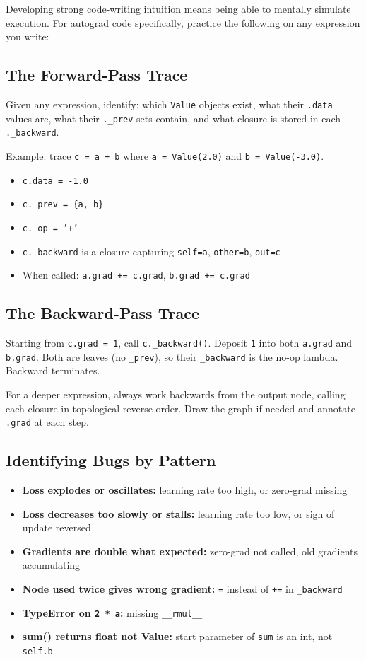\documentclass[12pt,a4paper]{article}
\newcommand{\code}[1]{\texttt{\small\color{deepblue}#1}}
\begin{document}
Developing strong code-writing intuition means being able to mentally simulate execution. For autograd code specifically, practice the following on any expression you write:

\subsection{The Forward-Pass Trace}

Given any expression, identify: which \code{Value} objects exist, what their \code{.data} values are, what their \code{.\_prev} sets contain, and what closure is stored in each \code{.\_backward}.

Example: trace \code{c = a + b} where \code{a = Value(2.0)} and \code{b = Value(-3.0)}.
\begin{itemize}
  \item \code{c.data = -1.0}
  \item \code{c.\_prev = \{a, b\}}
  \item \code{c.\_op = '+'}
  \item \code{c.\_backward} is a closure capturing \code{self=a}, \code{other=b}, \code{out=c}
  \item When called: \code{a.grad += c.grad}, \code{b.grad += c.grad}
\end{itemize}

\subsection{The Backward-Pass Trace}

Starting from \code{c.grad = 1}, call \code{c.\_backward()}. Deposit \code{1} into both \code{a.grad} and \code{b.grad}. Both are leaves (no \code{\_prev}), so their \code{\_backward} is the no-op lambda. Backward terminates.

For a deeper expression, always work backwards from the output node, calling each closure in topological-reverse order. Draw the graph if needed and annotate \code{.grad} at each step.

\subsection{Identifying Bugs by Pattern}

\begin{itemize}
  \item \textbf{Loss explodes or oscillates:} learning rate too high, or zero-grad missing
  \item \textbf{Loss decreases too slowly or stalls:} learning rate too low, or sign of update reversed
  \item \textbf{Gradients are double what expected:} zero-grad not called, old gradients accumulating
  \item \textbf{Node used twice gives wrong gradient:} \code{=} instead of \code{+=} in \code{\_backward}
  \item \textbf{TypeError on \texttt{2 * a}:} missing \code{\_\_rmul\_\_}
  \item \textbf{sum() returns float not Value:} start parameter of \code{sum} is an int, not \code{self.b}
\end{itemize}
\end{document}

